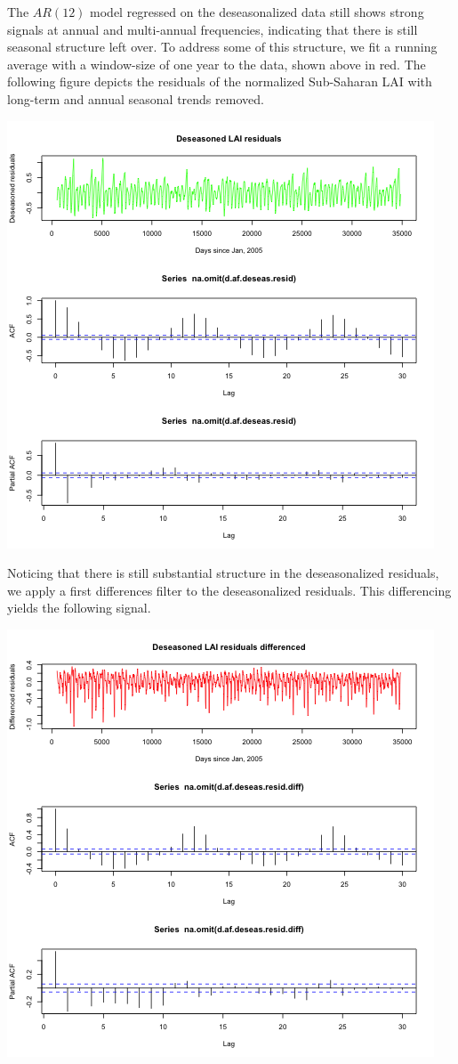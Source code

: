 \documentclass[11pt]{article}
\begin{document}
The $AR(12)$ model regressed on the deseasonalized data still shows strong
signals at annual and multi-annual frequencies, indicating that there is still
seasonal structure left over. To address some of this structure, we fit a
running average with a window-size of one year to the data, shown above in red.
The following figure depicts the residuals of the normalized Sub-Saharan LAI
with long-term and annual seasonal trends removed.

\includegraphics[width=\textwidth]{../img/deseasonalization_resid.png}

Noticing that there is still substantial structure in the deseasonalized
residuals, we apply a first differences filter to the deseasonalized residuals.
This differencing yields the following signal.

\includegraphics[width=\textwidth]{../img/deseasonalization_resid_difference.png}
\end{document}
